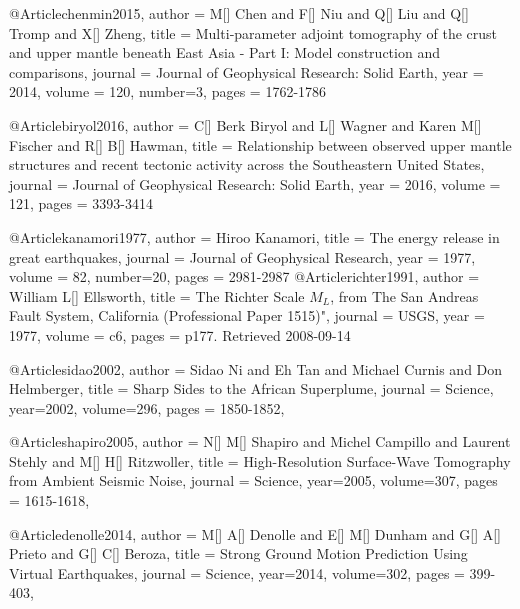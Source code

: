 @Article{chenmin2015,
  author = 	 {M[] Chen and F[] Niu and Q[] Liu and Q[] Tromp and X[] Zheng},
  title = 	 {Multi‐parameter adjoint tomography of the crust and upper mantle beneath {E}ast {A}sia - {P}art I: {M}odel construction and comparisons},
  journal = 	 {Journal of Geophysical Research: Solid Earth},
  year = 	 2014,
  volume = 120,
  number=3,
  pages =	 {1762-1786}
}


@Article{biryol2016,
  author = 	 {C[] Berk Biryol and L[] Wagner and Karen M[] Fischer and R[] B[] Hawman},
  title = 	 {Relationship between observed upper mantle structures and recent tectonic activity across the Southeastern United States},
  journal = 	 {Journal of Geophysical Research: Solid Earth},
  year = 	 2016,
  volume = 121,
  pages =	 {3393-3414}
}

@Article{kanamori1977,
  author = 	 {Hiroo Kanamori},
  title = 	 {The energy release in great earthquakes},
  journal = 	 {Journal of Geophysical Research},
  year = 	 1977,
  volume = 82,
  number=20,
  pages =	 {2981-2987}
}
@Article{richter1991,
  author = 	 {William L[] Ellsworth},
  title = 	 {The Richter Scale $M_L$, from The San Andreas Fault System, California (Professional Paper 1515)"},
  journal = 	 {USGS},
  year = 	 1977,
  volume = c6,
  pages =	 {p177. Retrieved 2008-09-14}
}



@Article{sidao2002,
  author =	 {Sidao Ni and Eh Tan and Michael Curnis and Don Helmberger},
  title =	 {Sharp Sides to the African Superplume},
  journal =	 {Science},
  year=2002,
  volume=296,
  pages =	 {1850-1852},
}

@Article{shapiro2005,
  author =	 {N[] M[] Shapiro and Michel Campillo and Laurent Stehly and M[] H[] Ritzwoller},
  title =	 {High-Resolution Surface-Wave Tomography from Ambient Seismic Noise},
  journal =	 {Science},
  year=2005,
  volume=307,
  pages =	 {1615-1618},
}

@Article{denolle2014,
  author =	 {M[] A[] Denolle and E[] M[] Dunham and G[] A[] Prieto and G[] C[] Beroza},
  title =	 {Strong Ground Motion Prediction Using Virtual Earthquakes},
  journal =	 {Science},
  year=2014,
  volume=302,
  pages =	 {399-403},
}

